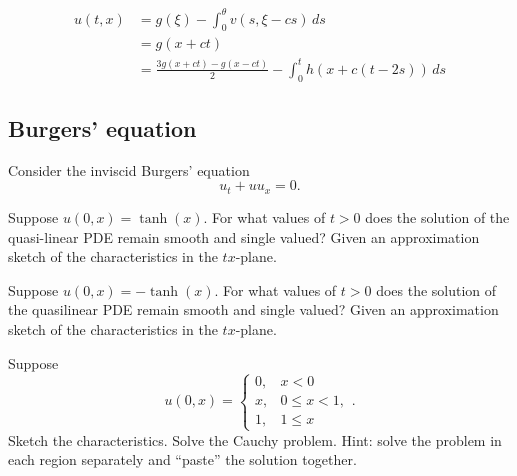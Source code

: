\documentclass[a4paper]{article}
\begin{document}
\begin{align*}
u(t,x)&=g(\xi)-\int_0^\theta v(s,\xi-cs)\,ds\\
&=g(x+ct)\\
&=\frac{3g(x+ct)-g(x-ct)}2-\int_0^th(x+c(t-2s))\,ds
\end{align*}



\clearpage
\subsection{Burgers' equation}

Consider the inviscid Burgers' equation
\[u_t+uu_x=0.\]
\begin{parts}
\item Suppose $u(0,x)=\tanh(x)$. For what values of $t>0$ does the solution of the quasi-linear PDE remain smooth and single valued? Given an approximation sketch of the characteristics in the $tx$-plane.
\item Suppose $u(0,x)=-\tanh(x)$. For what values of $t>0$ does the solution of the quasilinear PDE remain smooth and single valued? Given an approximation sketch of the characteristics in the $tx$-plane.
\item Suppose
\[u(0,x)=\begin{cases}0,&x<0\\x,&0\le x<1,\\1,&1\le x\end{cases}.\]
Sketch the characteristics. Solve the Cauchy problem. Hint: solve the problem in each region separately and ``paste'' the solution together.
\end{parts}


















\newpage
\end{document}
